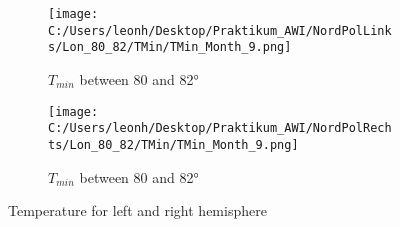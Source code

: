 \begin{figure}[ht]
    \begin{subfigure}{0.48\textwidth}
        \centering
        \texttt{[image: C:/Users/leonh/Desktop/Praktikum\_AWI/NordPolLinks/Lon\_80\_82/TMin/TMin\_Month\_9.png]}
        \caption{$T_{min}$ between 80 and 82°}
    \end{subfigure}
    \begin{subfigure}{0.48\textwidth}
        \centering
        \texttt{[image: C:/Users/leonh/Desktop/Praktikum\_AWI/NordPolRechts/Lon\_80\_82/TMin/TMin\_Month\_9.png]}
        \caption{$T_{min}$ between 80 and 82°}
    \end{subfigure}
    \caption{Temperature for left and right hemisphere}
    \label{app:MinTemp}
\end{figure}

